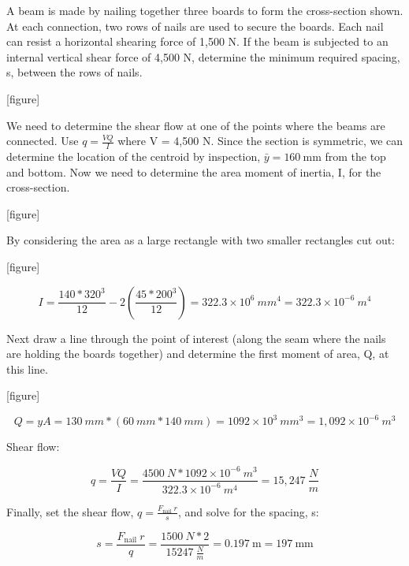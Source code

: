 \documentclass[
  letterpaper,
  DIV=11,
  numbers=noendperiod]{scrreprt}
\begin{document}
\begin{tcolorbox}[enhanced jigsaw, breakable, opacityback=0, toptitle=1mm, left=2mm, colback=white, opacitybacktitle=0.6, colframe=quarto-callout-tip-color-frame, titlerule=0mm, arc=.35mm, leftrule=.75mm, bottomtitle=1mm, colbacktitle=quarto-callout-tip-color!10!white, rightrule=.15mm, title={Example 10.5}, bottomrule=.15mm, toprule=.15mm, coltitle=black]

A beam is made by nailing together three boards to form the
cross-section shown. At each connection, two rows of nails are used to
secure the boards. Each nail can resist a horizontal shearing force of
1,500 N. If the beam is subjected to an internal vertical shear force of
4,500 N, determine the minimum required spacing, s, between the rows of
nails.

{[}figure{]}

\begin{tcolorbox}[enhanced jigsaw, breakable, opacityback=0, toptitle=1mm, left=2mm, colback=white, opacitybacktitle=0.6, colframe=quarto-callout-tip-color-frame, titlerule=0mm, arc=.35mm, leftrule=.75mm, bottomtitle=1mm, colbacktitle=quarto-callout-tip-color!10!white, rightrule=.15mm, title={Solution}, bottomrule=.15mm, toprule=.15mm, coltitle=black]

We need to determine the shear flow at one of the points where the beams
are connected. Use \(q=\frac{V Q}{I}\) where V = 4,500 N. Since the
section is symmetric, we can determine the location of the centroid by
inspection, \(\bar{y}=160 \mathrm{~mm}\) from the top and bottom. Now we
need to determine the area moment of inertia, I, for the cross-section.

{[}figure{]}

By considering the area as a large rectangle with two smaller rectangles
cut out:

{[}figure{]}

\[
I=\frac{140 * 320^3}{12}-2\left(\frac{45 * 200^3}{12}\right)=322.3 \times 10^6{~mm}^4=322.3 \times 10^{-6}{~m}^4
\]

Next draw a line through the point of interest (along the seam where the
nails are holding the boards together) and determine the first moment of
area, Q, at this line.

{[}figure{]}

\[
Q=y A=130{~mm} *(60{~mm} * 140{~mm})=1092 \times 10^3{~mm}^3=1,092 \times 10^{-6}{~m}^3
\]

Shear flow:

\[
q=\frac{V Q}{I}=\frac{4500 {~N}* 1092 \times 10^{-6}{~m}^3}{322.3 \times 10^{-6}{~m}^4}=15,247~\frac{N}{m}
\]

Finally, set the shear flow, \(q=\frac{F_{\text {nail }} r}{s}\), and
solve for the spacing, s:

\[
s=\frac{F_{\text {nail }} r}{q}=\frac{1500{~N} * 2}{15247~\frac{N}{m}}=0.197 \mathrm{~m}=197 \mathrm{~mm}
\]

\end{tcolorbox}

\end{tcolorbox}
\end{document}
